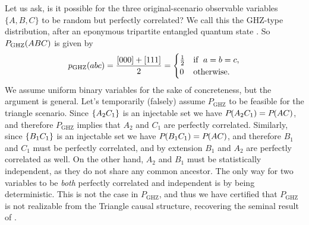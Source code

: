 {Let us ask, is it possible for the three original-scenario observable variables $\{A,B,C\}$ to be random but perfectly correlated? We call this the GHZ-type distribution, after an eponymous tripartite entangled quantum state \cite{greenberger1989going,3Qubits2Ways}. So $P_{\text{GHZ}}\lparen A B C\rparen$ is given by
\begin{align}\label{eq:ghzdistribution1}
p_{\text{GHZ}}\lparen a b c\rparen=\frac{[000]+[111]}{2}=\begin{cases}\tfrac{1}{2}&\text{if }\; a=b=c, \\ 0&\text{otherwise}.\end{cases}
\end{align}
We assume uniform binary variables for the sake of concreteness, but the argument is general. Let's temporarily (falsely) assume $P_{\text{GHZ}}$ to be feasible for the triangle scenario. Since $\left\lbrace A_2 C_1\right\rbrace$ is an injectable set we have ${P_{}}\lparen A_2 C_1\rparen={P_{}}\lparen A C\rparen$, and therefore $P_{\text{GHZ}}$ implies that $A_2$ and $C_1$ are perfectly correlated. Similarly, since $\left\lbrace B_1 C_1\right\rbrace$ is an injectable set we have ${P_{}}\lparen B_1 C_1\rparen={P_{}}\lparen A C\rparen$, and therefore $B_1$ and $C_1$ must be perfectly correlated, and by extension $B_1$ and $A_2$ are perfectly correlated as well. On the other hand, $A_2$ and $B_1$ must be statistically independent, as they do not share any common ancestor. The only way for two variables to be \emph{both} perfectly correlated and independent is by being deterministic. This is not the case in $P_{\text{GHZ}}$, and thus we have certified that $P_{\text{GHZ}}$ is not realizable from the Triangle causal structure, recovering the seminal result of \citet{steudel2010ancestors}.

}

